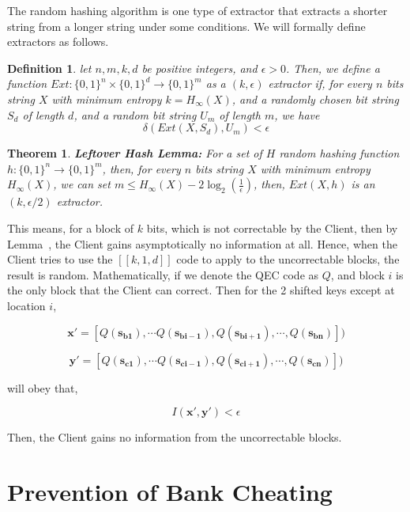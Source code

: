 \documentclass[%
 reprint,
superscriptaddress,
 amsmath,amssymb,
 aps,
]{revtex4-2}
\newtheorem{theorem}{Theorem}[section]
\newtheorem{definition}{Definition}[section]
\begin{document}
The random hashing algorithm is one type of extractor that extracts a shorter string from a longer string under some conditions. We will formally define extractors as follows.
\begin{definition}
    let $n, m, k, d$ be positive integers, and $\epsilon > 0$. Then, we define a function $Ext: \{0, 1\}^n\times \{0, 1\}^d \rightarrow \{0, 1\}^m$ as a $(k, \epsilon)$ extractor if, for every $n$ bits string $X$ with minimum entropy $k = H_\infty(X)$, and a randomly chosen bit string $S_d$ of length $d$, and a random bit string $U_m$ of length $m$, we have 
    $$\delta(Ext(X, S_d), U_m)<\epsilon$$
\end{definition}

\begin{theorem}
  \textbf{Leftover Hash Lemma:} For a set of $H$ random hashing function $h: \{0, 1\}^n \rightarrow \{0, 1\}^m$, then, for every $n$ bits string $X$ with minimum entropy $H_\infty(X)$, we can set $m\le H_\infty(X) - 2\log_2\left(\frac{1}{\epsilon}\right)$, then, $Ext(X, h)$ is an $(k, \epsilon/2)$ extractor.
\end{theorem}
This means, for a block of $k$ bits, which is not correctable by the Client, then by Lemma~\cite{Leftover_Hash_lemma}, the Client gains asymptotically no information at all. Hence, when the Client tries to use the $[[k, 1, d]]$ code to apply to the uncorrectable blocks, the result is random. Mathematically, if we denote the QEC code as $Q$, and block $i$ is the only block that the Client can correct. Then for the 2 shifted keys except at location $i$,

\begin{equation}
    \mathbf{x'}=[Q(\mathbf{s_{b1}}), \cdots Q(\mathbf{s_{bi-1}}), Q(\mathbf{s_{bi+1}}), \cdots, Q(\mathbf{s_{bn}}) ])
\end{equation}

\begin{equation}
    \mathbf{y'}=[Q(\mathbf{s_{c1}}), \cdots Q(\mathbf{s_{ci-1}}), Q(\mathbf{s_{ci+1}}), \cdots, Q(\mathbf{s_{cn}}) ])
\end{equation}

will obey that,

\begin{equation}
    I(\mathbf{x'}, \mathbf{y'})<\epsilon
\end{equation}

Then, the Client gains no information from the uncorrectable blocks.


\section{Prevention of Bank Cheating}
\end{document}
